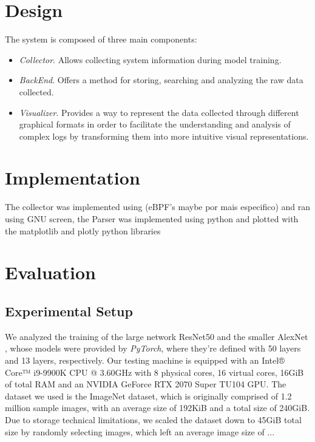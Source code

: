 \documentclass[conference]{IEEEtran}
\begin{document}
\section{Design}
    The system is composed of three main components:
    \begin{itemize}
        \item \textit{Collector}. Allows collecting system information during model training.
        \item \textit{BackEnd}. Offers a method for storing, searching and analyzing the raw data collected.
        \item \textit{Visualizer}. Provides a way to represent the data collected through different graphical formats in order to facilitate the understanding and analysis of complex logs by transforming them into more intuitive visual representations.
    \end{itemize}

\section{Implementation}
    The collector was implemented using (eBPF's maybe por mais especifico) and ran using GNU screen, the Parser was implemented using python and plotted with the matplotlib and plotly python libraries 

\section{Evaluation}

\subsection{Experimental Setup}

We analyzed the training of the large network ResNet50 \cite{resnet50} and the smaller AlexNet \cite{alexnet}, whose models were
provided by \textit{PyTorch}, where they're defined with 50 layers and 13 layers, respectively. Our testing machine is equipped with an Intel® Core™ i9-9900K CPU @ 3.60GHz with
8 physical cores, 16 virtual cores, 16GiB of total RAM and an NVIDIA GeForce RTX 2070 Super TU104 GPU. The dataset we used is the ImageNet \cite{imagenet} dataset, which is originally comprised of 1.2 million sample images, with an average size of 192KiB and a total size of 240GiB. Due to storage technical limitations, we scaled the dataset down to 45GiB total size by randomly selecting images, which left an average image size of ...
\end{document}
